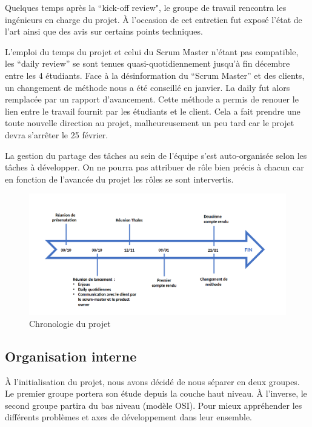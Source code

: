Quelques temps après la “kick-off review", le groupe de travail rencontra les ingénieurs en charge
du projet. À l’occasion de cet entretien fut exposé l’état de l’art ainsi que des avis sur certains
points techniques. \medskip

L’emploi du temps du projet et celui du Scrum Master n’étant pas compatible, les “daily review” se
sont tenues quasi-quotidiennement jusqu’à fin décembre entre les 4 étudiants. Face à la désinformation
du “Scrum Master” et des clients, un changement de méthode nous a été conseillé en janvier. La daily
fut alors remplacée par un rapport d’avancement. Cette méthode a permis de renouer le lien entre le
travail fournit par les étudiants et le client. Cela a fait prendre une toute nouvelle direction au
projet, malheureusement un peu tard car le projet devra s'arrêter le 25 février.\medskip

La gestion du partage des tâches au sein de l’équipe s’est auto-organisée selon les tâches à
développer. On ne pourra pas attribuer de rôle bien précis à chacun car en fonction de l'avancée du
projet les rôles se sont intervertis.

\begin{figure}[th]
    \centering
    \includegraphics[scale=0.35]{Figures/fleche.png}
    \decoRule
    \caption{Chronologie du projet}  \label{fig:fleche}
\end{figure}

\subsection{Organisation interne}

À l’initialisation du projet, nous avons décidé de nous séparer en deux groupes. Le
premier groupe portera son étude depuis la couche haut niveau. À l’inverse, le second
groupe partira du bas niveau (modèle OSI). Pour mieux appréhender les différents
problèmes et axes de développement dans leur ensemble. \medskip

